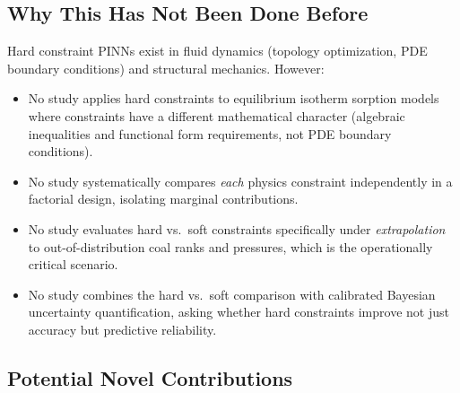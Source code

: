 \documentclass[12pt,a4paper]{article}
\begin{document}
\subsection{Why This Has Not Been Done Before}

Hard constraint PINNs exist in fluid dynamics (topology optimization,
PDE boundary conditions) and structural mechanics. However:
\begin{itemize}
  \item No study applies hard constraints to equilibrium isotherm
    sorption models where constraints have a different mathematical
    character (algebraic inequalities and functional form requirements,
    not PDE boundary conditions).
  \item No study systematically compares \emph{each} physics constraint
    independently in a factorial design, isolating marginal contributions.
  \item No study evaluates hard vs.\ soft constraints specifically
    under \emph{extrapolation} to out-of-distribution coal ranks and
    pressures, which is the operationally critical scenario.
  \item No study combines the hard vs.\ soft comparison with calibrated
    Bayesian uncertainty quantification, asking whether hard constraints
    improve not just accuracy but predictive reliability.
\end{itemize}

\subsection{Potential Novel Contributions}
\end{document}
